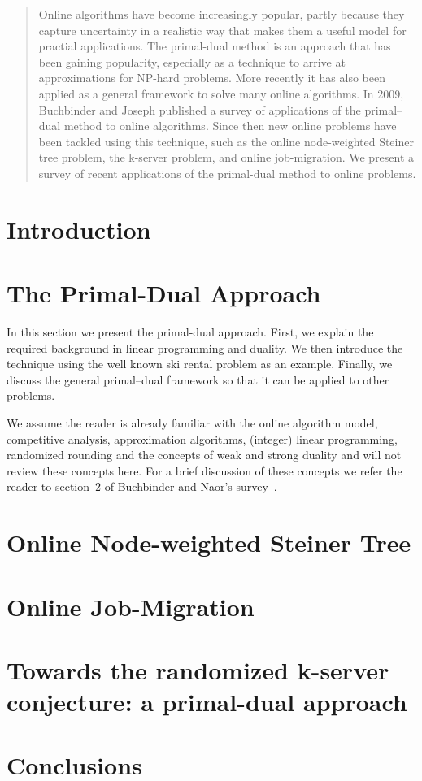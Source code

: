 \documentclass[10pt, twocolumn]{article}
\begin{document}
\maketitle

\begin{abstract}
Online algorithms have become increasingly popular, partly because they capture uncertainty in a realistic way that makes them a useful model for practial applications.
The primal-dual method is an approach that has been gaining popularity, especially as a technique to arrive at approximations for NP-hard problems.
More recently it has also been applied as a general framework to solve many online algorithms.
In 2009, Buchbinder and Joseph published a survey of applications of the primal--dual method to online algorithms.
Since then new online problems have been tackled using this technique, such as the online node-weighted Steiner tree problem, the k-server problem, and online job-migration.
We present a survey of recent applications of the primal-dual method to online problems.
\end{abstract}

\section{Introduction}




\section{The Primal-Dual Approach}

In this section we present the primal-dual approach.
First, we explain the required background in linear programming and duality.
We then introduce the technique using the well known ski rental problem as an example.
Finally, we discuss the general primal--dual framework so that it can be applied to other problems.

We assume the reader is already familiar with the online algorithm model, competitive analysis, approximation algorithms, (integer) linear programming, randomized rounding and the concepts of weak and strong duality and will not review these concepts here.
For a brief discussion of these concepts we refer the reader to section~2 of Buchbinder and Naor's survey~\cite{buchbinder09:survey}.





\section{Online Node-weighted Steiner Tree}


\section{Online Job-Migration}


\section{Towards the randomized k-server conjecture: a primal-dual approach}


\section{Conclusions}



\end{document}

